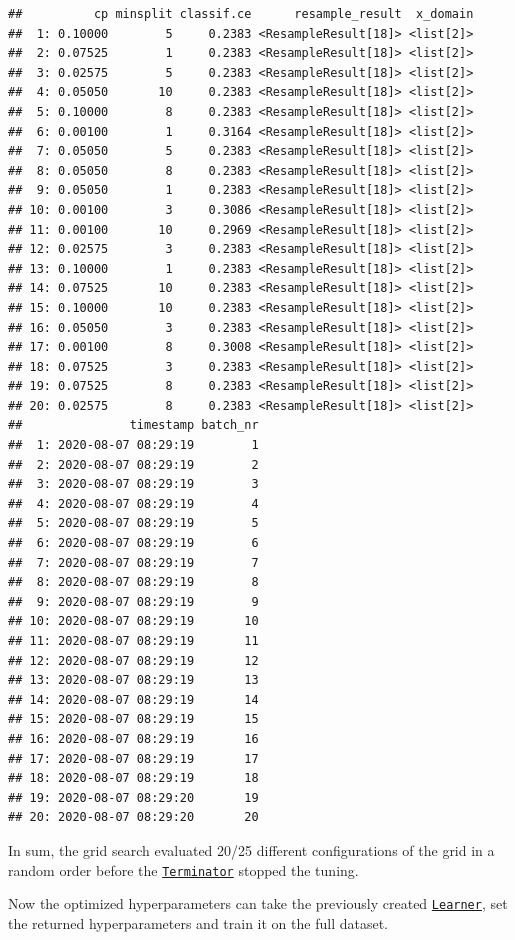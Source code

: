 \documentclass[]{scrbook}
\begin{document}
\begin{verbatim}
##          cp minsplit classif.ce      resample_result  x_domain
##  1: 0.10000        5     0.2383 <ResampleResult[18]> <list[2]>
##  2: 0.07525        1     0.2383 <ResampleResult[18]> <list[2]>
##  3: 0.02575        5     0.2383 <ResampleResult[18]> <list[2]>
##  4: 0.05050       10     0.2383 <ResampleResult[18]> <list[2]>
##  5: 0.10000        8     0.2383 <ResampleResult[18]> <list[2]>
##  6: 0.00100        1     0.3164 <ResampleResult[18]> <list[2]>
##  7: 0.05050        5     0.2383 <ResampleResult[18]> <list[2]>
##  8: 0.05050        8     0.2383 <ResampleResult[18]> <list[2]>
##  9: 0.05050        1     0.2383 <ResampleResult[18]> <list[2]>
## 10: 0.00100        3     0.3086 <ResampleResult[18]> <list[2]>
## 11: 0.00100       10     0.2969 <ResampleResult[18]> <list[2]>
## 12: 0.02575        3     0.2383 <ResampleResult[18]> <list[2]>
## 13: 0.10000        1     0.2383 <ResampleResult[18]> <list[2]>
## 14: 0.07525       10     0.2383 <ResampleResult[18]> <list[2]>
## 15: 0.10000       10     0.2383 <ResampleResult[18]> <list[2]>
## 16: 0.05050        3     0.2383 <ResampleResult[18]> <list[2]>
## 17: 0.00100        8     0.3008 <ResampleResult[18]> <list[2]>
## 18: 0.07525        3     0.2383 <ResampleResult[18]> <list[2]>
## 19: 0.07525        8     0.2383 <ResampleResult[18]> <list[2]>
## 20: 0.02575        8     0.2383 <ResampleResult[18]> <list[2]>
##               timestamp batch_nr
##  1: 2020-08-07 08:29:19        1
##  2: 2020-08-07 08:29:19        2
##  3: 2020-08-07 08:29:19        3
##  4: 2020-08-07 08:29:19        4
##  5: 2020-08-07 08:29:19        5
##  6: 2020-08-07 08:29:19        6
##  7: 2020-08-07 08:29:19        7
##  8: 2020-08-07 08:29:19        8
##  9: 2020-08-07 08:29:19        9
## 10: 2020-08-07 08:29:19       10
## 11: 2020-08-07 08:29:19       11
## 12: 2020-08-07 08:29:19       12
## 13: 2020-08-07 08:29:19       13
## 14: 2020-08-07 08:29:19       14
## 15: 2020-08-07 08:29:19       15
## 16: 2020-08-07 08:29:19       16
## 17: 2020-08-07 08:29:19       17
## 18: 2020-08-07 08:29:19       18
## 19: 2020-08-07 08:29:20       19
## 20: 2020-08-07 08:29:20       20
\end{verbatim}

In sum, the grid search evaluated 20/25 different configurations of the grid in a random order before the \href{https://bbotk.mlr-org.com/reference/Terminator.html}{\texttt{Terminator}} stopped the tuning.

Now the optimized hyperparameters can take the previously created \href{https://mlr3.mlr-org.com/reference/Learner.html}{\texttt{Learner}}, set the returned hyperparameters and train it on the full dataset.
\end{document}
